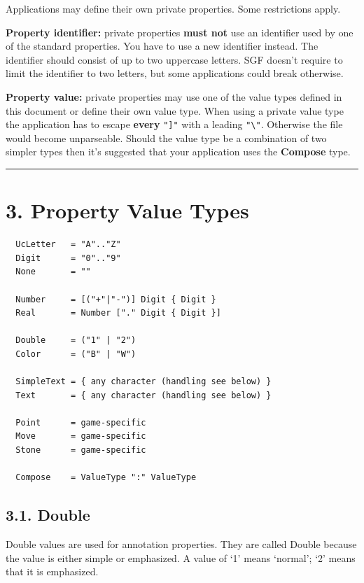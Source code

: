 Applications may define their own private properties. Some restrictions
apply.

\textbf{Property identifier:} private properties \textbf{must not} use
an identifier used by one of the standard properties. You have to use a
new identifier instead. The identifier should consist of up to two
uppercase letters. SGF doesn't require to limit the identifier to two
letters, but some applications could break otherwise.

\textbf{Property value:} private properties may use one of the value
types defined in this document or define their own value type. When
using a private value type the application has to escape \textbf{every}
\texttt{"{]}"} with a leading \texttt{"\textbackslash{}"}. Otherwise the
file would become unparseable. Should the value type be a combination of
two simpler types then it's suggested that your application uses the
\textbf{Compose} type.

\begin{center}\rule{0.5\linewidth}{0.5pt}\end{center}

\section{3. Property Value Types}\label{property-value-types}

\begin{verbatim}
  UcLetter   = "A".."Z"
  Digit      = "0".."9"
  None       = ""

  Number     = [("+"|"-")] Digit { Digit }
  Real       = Number ["." Digit { Digit }]

  Double     = ("1" | "2")
  Color      = ("B" | "W")

  SimpleText = { any character (handling see below) }
  Text       = { any character (handling see below) }

  Point      = game-specific
  Move       = game-specific
  Stone      = game-specific

  Compose    = ValueType ":" ValueType
\end{verbatim}

\subsection{3.1. Double}\label{double}

Double values are used for annotation properties. They are called Double
because the value is either simple or emphasized. A value of `1' means
`normal'; `2' means that it is emphasized.

